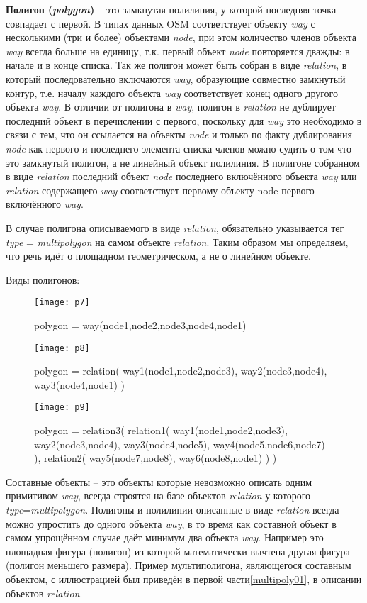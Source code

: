 \textbf{Полигон (\emph{polygon})} -- это замкнутая полилиния, у которой 
последняя точка совпадает с первой. В типах данных OSM соответствует объекту 
\emph{way} с несколькими (три и более) объектами \emph{node}, при этом 
количество членов объекта \emph{way} всегда больше на единицу, т.к. первый 
объект \emph{node} повторяется дважды: в начале и в конце списка. Так же 
полигон может быть собран в виде \emph{relation}, в который последовательно 
включаются \emph{way}, образующие совместно замкнутый контур, т.е. началу 
каждого объекта \emph{way} соответствует конец одного другого объекта 
\emph{way}. В отличии от полигона в \emph{way}, полигон в \emph{relation} не 
дублирует последний объект в перечислении с первого, поскольку для \emph{way} 
это необходимо в связи с тем, что он ссылается на объекты \emph{node} и 
только по факту дублирования \emph{node} как первого и последнего элемента 
списка членов можно судить о том что это замкнутый полигон, а не линейный 
объект полилиния. В полигоне собранном в виде \emph{relation} последний объект 
\emph{node} последнего включённого объекта \emph{way} или \emph{relation} 
содержащего \emph{way} соответствует первому объекту node первого включённого 
\emph{way}.

В случае полигона описываемого в виде \emph{relation}, обязательно указывается 
тег \emph{type} = \emph{multipolygon} на самом объекте \emph{relation}. Таким 
образом мы определяем, что речь идёт о площадном геометрическом, а не о 
линейном объекте.

Виды полигонов:

\begin{figure}[ht!]
    \texttt{[image: p7]}
    \caption{polygon = way(node1,node2,node3,node4,node1)}
    \texttt{[image: p8]}
    \caption{polygon = relation( way1(node1,node2,node3), way2(node3,node4), way3(node4,node1) )}
    \texttt{[image: p9]}
    \caption{polygon = relation3( relation1( way1(node1,node2,node3), way2(node3,node4), way3(node4,node5), way4(node5,node6,node7) ), relation2( way5(node7,node8), way6(node8,node1) ) )}
\end{figure}

Составные объекты -- это объекты которые невозможно описать одним примитивом 
\emph{way}, всегда строятся на базе объектов \emph{relation} у которого 
\emph{type}=\emph{multipolygon}. Полигоны и полилинии описанные в виде 
\emph{relation} всегда можно упростить до одного объекта \emph{way}, в то 
время как составной объект в самом упрощённом случае даёт минимум два объекта 
\emph{way}. Например это площадная фигура (полигон) из которой математически 
вычтена другая фигура (полигон меньшего размера). Пример мультиполигона, 
являющегося составным объектом, с иллюстрацией был приведён в первой 
части\ref{multipoly01}, в описании объектов \emph{relation}.


